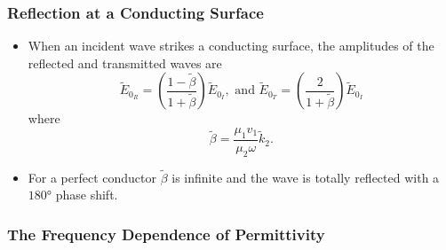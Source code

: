 \documentclass{article}
\begin{document}
\subsubsection{Reflection at a Conducting Surface}

\begin{itemize}
  \item When an incident wave strikes a conducting surface, the amplitudes of the reflected and transmitted waves are \[\tilde{E}_{0_R} = \left( \frac{1 - \tilde{\beta}}{1 + \tilde{\beta}} \right) \tilde{E}_{0_I}, \text{ and } \tilde{E}_{0_T} = \left( \frac{2}{1 + \tilde{\beta}} \right) \tilde{E}_{0_I}\] where \[\tilde{\beta} = \frac{\mu_1 v_1}{\mu_2 \omega} \tilde{k}_2.\]

  \item For a perfect conductor $\tilde{\beta}$ is infinite and the wave is totally reflected with a $\ang{180}$ phase shift.
\end{itemize}

\subsubsection{The Frequency Dependence of Permittivity}
\end{document}
